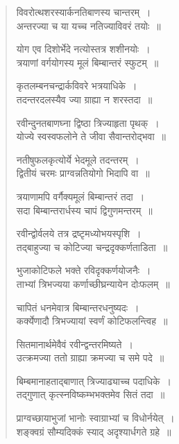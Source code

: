 \documentclass[11pt, openany]{book}
\begin{document}
\begin{quote}
{\qt विवरोत्थशरस्यार्कनतिबाणस्य चान्तरम्~।\\
अन्तरज्या च या यच्च नतिज्याविवरं तयोः~॥

योग एव दिशोर्भेदे नत्योस्तत्र शशीनयोः~।\\
त्रयाणां वर्गयोगस्य मूलं बिम्बान्तरं स्फुटम्~॥

कृतलम्बनचन्द्रार्कविवरे भत्रयाधिके~।\\
तदन्तरदलस्यैव ज्या ग्राह्या न शरस्तदा~॥

रवीन्दुनतबाणघ्ना द्विष्ठा त्रिज्याहृता पृथक्~।\\
योज्ये स्वस्वफलोने ते जीवा सैवान्तरोद्भवा~॥

नतीषुफलकृत्योर्ये भेदमूले तदन्तरम्~।\\
द्वितीयं चरमः प्राग्वन्नतियोगो भिदापि वा~॥

त्रयाणामपि वर्गैक्यमूलं बिम्बान्तरं तदा~।\\
सदा बिम्बान्तरार्धस्य चापं द्विगुणमन्तरम्~॥

रवीन्द्वोर्वलये तत्र द्रष्टृमध्योभयस्पृशि~।\\
तद्बाहुज्या च कोटिज्या चन्द्रदृक्कर्णताडिता~॥

भुजाकोटिफले भक्ते रविदृक्कर्णयोजनैः~।\\
ताभ्यां त्रिभज्यया कर्णाच्छीघ्रन्यायेन दोःफलम्~॥

चापितं धनमेवात्र बिम्बान्तरधनुष्यदः~।\\
कर्क्येणादौ त्रिभज्यायां स्वर्णं कोटिफलन्त्विह~॥

सितमानार्थमेवैवं रवीन्द्वन्तरमिष्यते~।\\
उत्क्रमज्या ततो ग्राह्या क्रमज्या च समे पदे~॥

बिम्बमानाहताद्बाणात् त्रिज्याढ्याच्च पदाधिके~।\\
तद्गुणात् कृत्स्नविष्कम्भभक्तमेव सितं तदा~॥

प्राग्वच्छायाभुजां भानोः स्वाग्राभ्यां च विधोर्नयेत्~।\\
शङ्क्वग्रं सौम्यदिक्कं स्याद् अदृश्यार्धगते ग्रहे~॥}
\end{quote}

\newpage
\end{document}
